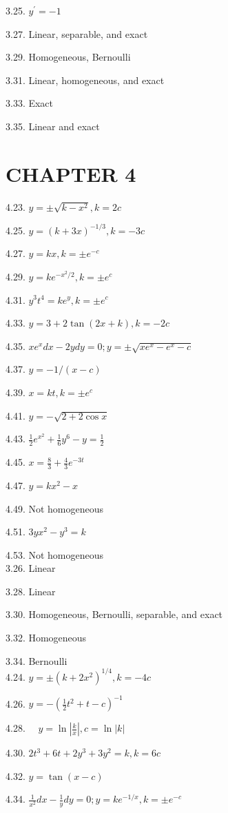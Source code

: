 \documentclass[10pt]{article}
\begin{document}
3.25. $y^{\prime}=-1$

3.27. Linear, separable, and exact

3.29. Homogeneous, Bernoulli

3.31. Linear, homogeneous, and exact

3.33. Exact

3.35. Linear and exact

\section*{CHAPTER 4}
4.23. $y= \pm \sqrt{k-x^{2}}, k=2 c$

4.25. $y=(k+3 x)^{-1 / 3}, k=-3 c$

4.27. $y=k x, k= \pm e^{-c}$

4.29. $y=k e^{-x^{2} / 2}, k= \pm e^{c}$

4.31. $y^{3} t^{4}=k e^{y}, k= \pm e^{c}$

4.33. $y=3+2 \tan (2 x+k), k=-2 c$

4.35. $x e^{x} d x-2 y d y=0 ; y= \pm \sqrt{x e^{x}-e^{x}-c}$

4.37. $y=-1 /(x-c)$

4.39. $x=k t, k= \pm e^{c}$

4.41. $y=-\sqrt{2+2 \cos x}$

4.43. $\frac{1}{2} e^{x^{2}}+\frac{1}{6} y^{6}-y=\frac{1}{2}$

4.45. $x=\frac{8}{3}+\frac{4}{3} e^{-3 t}$

4.47. $y=k x^{2}-x$

4.49. Not homogeneous

4.51. $3 y x^{2}-y^{3}=k$

4.53. Not homogeneous\\
3.26. Linear

3.28. Linear

3.30. Homogeneous, Bernoulli, separable, and exact

3.32. Homogeneous

3.34. Bernoulli\\
4.24. $y= \pm\left(k+2 x^{2}\right)^{1 / 4}, k=-4 c$

4.26. $y=-\left(\frac{1}{2} t^{2}+t-c\right)^{-1}$

4.28. $\quad y=\ln \left|\frac{k}{x}\right|, c=\ln |k|$

4.30. $2 t^{3}+6 t+2 y^{3}+3 y^{2}=k, k=6 c$

4.32. $y=\tan (x-c)$

4.34. $\frac{1}{x^{2}} d x-\frac{1}{y} d y=0 ; y=k e^{-1 / x}, k= \pm e^{-c}$
\end{document}
